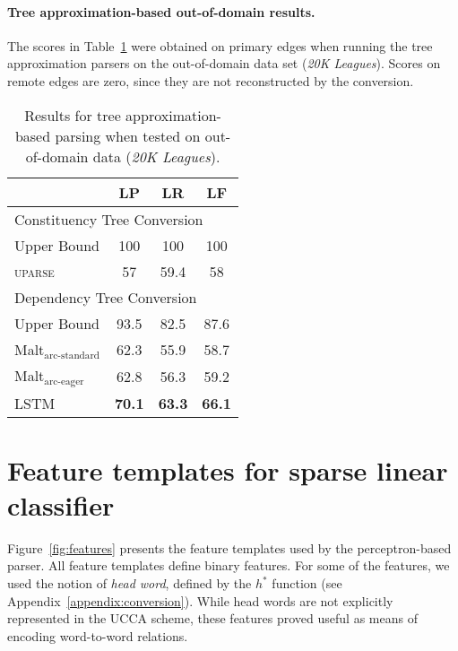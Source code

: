\documentclass[11pt,a4paper]{article}
\newcommand{\figref}[1]{Figure~\ref{#1}}
\newcommand{\tabref}[1]{Table~\ref{#1}}
\begin{document}
\paragraph{Tree approximation-based out-of-domain results.}

The scores in \tabref{tab:ood_converted} were obtained on primary edges when running the
tree approximation parsers on the out-of-domain data set (\textit{20K Leagues}).
Scores on remote edges are zero, since they are not reconstructed by the conversion.
\begin{table}[ht]
  \centering
\begin{tabular}{l|ccc}
& \textbf{LP} & \textbf{LR} & \textbf{LF} \\
\hline
\multicolumn{4}{l}{\rule{0pt}{2ex} \footnotesize Constituency Tree Conversion} \\
Upper Bound & 100 & 100 & 100 \vspace{.1cm} \\
\textsc{uparse} & 57 & 59.4 & 58 \\
\hline
\multicolumn{4}{l}{\rule{0pt}{4ex} \footnotesize Dependency Tree Conversion} \\
Upper Bound & 93.5 & 82.5 & 87.6 \vspace{.1cm} \\
Malt$_{\textrm{arc-standard}}$ & 62.3 & 55.9 & 58.7 \\
Malt$_{\textrm{arc-eager}}$ & 62.8 & 56.3 & 59.2 \\
LSTM & {\bf 70.1} & {\bf 63.3} & {\bf 66.1} \\
\end{tabular}
\caption{Results for tree approximation-based parsing when tested on out-of-domain data
(\textit{20K Leagues}).}
\label{tab:ood_converted}
\end{table}

\section{Feature templates for sparse linear classifier}
\label{appendix:features}

\figref{fig:features} presents the feature templates used by the perceptron-based parser.
All feature templates define binary features.
For some of the features, we used the notion of \textit{head word},
defined by the $h^*$ function (see Appendix~\ref{appendix:conversion}).
While head words are not explicitly represented in the UCCA scheme, these
features proved useful as means of encoding word-to-word relations.
\end{document}
